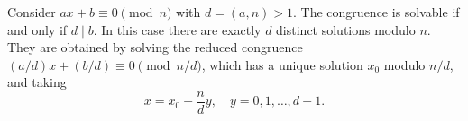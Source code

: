 Consider $ax + b \equiv 0 \pmod{n}$ with $d = (a, n) > 1$. The congruence is solvable if and only if $d \mid b$. In this case there are exactly $d$ distinct solutions modulo $n$. They are obtained by solving the reduced congruence $(a/d)x + (b/d) \equiv 0 \pmod{n/d}$, which has a unique solution $x_0$ modulo $n/d$, and taking
$$x = x_0 + \frac{n}{d} y, \quad y = 0, 1, \ldots, d-1.$$
